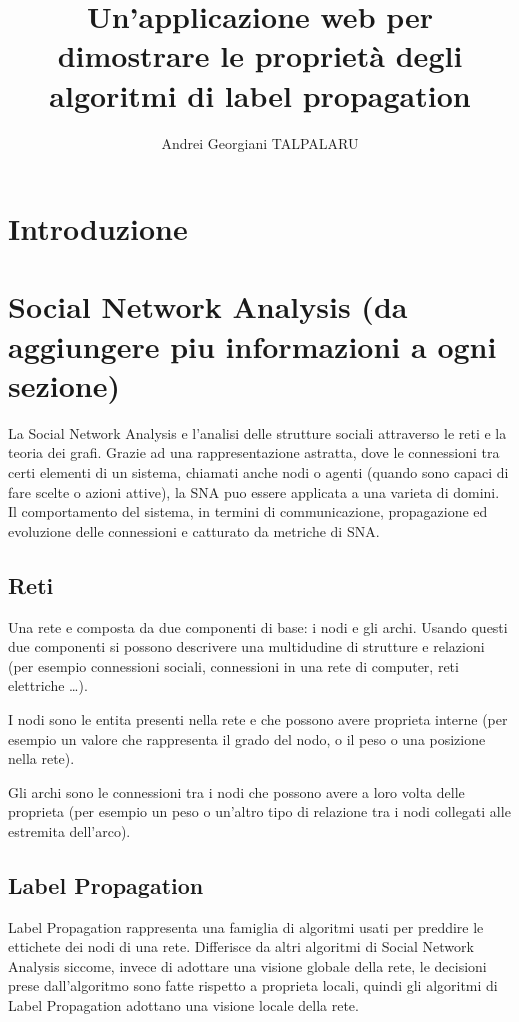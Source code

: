 \documentclass[a4paper,12pt]{report}
\begin{document}
\title{Un'applicazione web per dimostrare le proprietà degli algoritmi di label propagation}
\author{Andrei Georgiani TALPALARU}

\beforepreface
{}
\afterpreface
% 
% 
%		
\chapter{Introduzione}
\label{cap1}
%

\chapter{Social Network Analysis (da aggiungere piu informazioni a ogni sezione)}
	La Social Network Analysis e l'analisi delle strutture sociali attraverso le reti e la teoria dei grafi. \cite{snaintro}
	Grazie ad una rappresentazione astratta, dove le connessioni tra certi elementi di un sistema, chiamati anche nodi o agenti (quando sono capaci di fare scelte o azioni attive), la SNA puo essere applicata a una varieta di domini. Il comportamento del sistema, in termini di communicazione, propagazione ed evoluzione delle connessioni e catturato da metriche di SNA. \cite{avpra}

	\section{Reti}
	Una rete e composta da due componenti di base: i nodi e gli archi. Usando questi due componenti si possono descrivere una multidudine di strutture e relazioni (per esempio connessioni sociali, connessioni in una rete di computer, reti elettriche \dots). \par
	 I nodi sono le entita presenti nella rete e che possono avere proprieta interne (per esempio un valore che rappresenta il grado del nodo, o il peso o una posizione nella rete). \par
	Gli archi sono le connessioni tra i nodi che possono avere a loro volta delle proprieta (per esempio un peso o un'altro tipo di relazione tra i nodi collegati alle estremita dell'arco).	\cite{snaintro} \par

	\section{Label Propagation}
	Label Propagation rappresenta una famiglia di algoritmi usati per preddire le ettichete dei nodi di una rete. 
	Differisce da altri algoritmi di Social Network Analysis siccome, invece di adottare una visione globale della rete, le decisioni prese dall'algoritmo sono fatte rispetto a proprieta locali, quindi gli algoritmi di Label Propagation adottano una visione locale della rete. \cite{raghavan} \par
\end{document}
